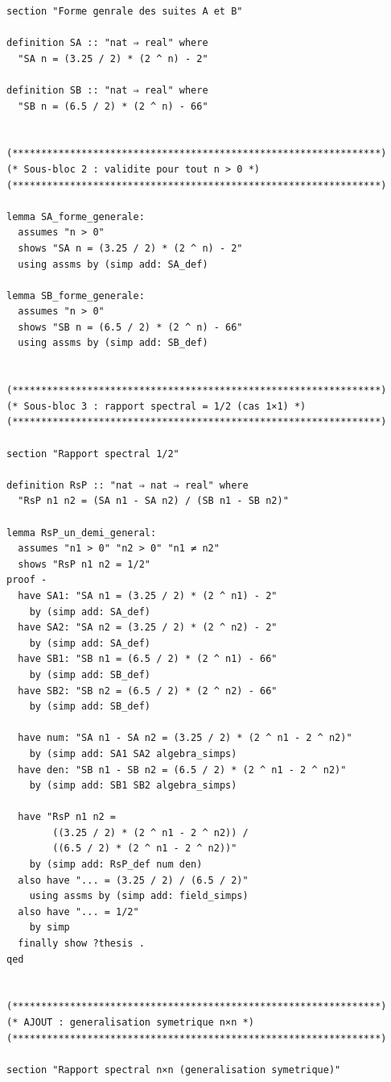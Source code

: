 \documentclass[a4paper,11pt]{article}
\begin{document}
\begin{holcode}[title={\textcolor{white}{Fichier : methode\_spectral.thy -- Partie 1/4}}]
\begin{lstlisting}
section "Forme genrale des suites A et B"

definition SA :: "nat ⇒ real" where
  "SA n = (3.25 / 2) * (2 ^ n) - 2"

definition SB :: "nat ⇒ real" where
  "SB n = (6.5 / 2) * (2 ^ n) - 66"


(****************************************************************)
(* Sous-bloc 2 : validite pour tout n > 0 *)
(****************************************************************)

lemma SA_forme_generale:
  assumes "n > 0"
  shows "SA n = (3.25 / 2) * (2 ^ n) - 2"
  using assms by (simp add: SA_def)

lemma SB_forme_generale:
  assumes "n > 0"
  shows "SB n = (6.5 / 2) * (2 ^ n) - 66"
  using assms by (simp add: SB_def)


(****************************************************************)
(* Sous-bloc 3 : rapport spectral = 1/2 (cas 1×1) *)
(****************************************************************)

section "Rapport spectral 1/2"

definition RsP :: "nat ⇒ nat ⇒ real" where
  "RsP n1 n2 = (SA n1 - SA n2) / (SB n1 - SB n2)"

lemma RsP_un_demi_general:
  assumes "n1 > 0" "n2 > 0" "n1 ≠ n2"
  shows "RsP n1 n2 = 1/2"
proof -
  have SA1: "SA n1 = (3.25 / 2) * (2 ^ n1) - 2"
    by (simp add: SA_def)
  have SA2: "SA n2 = (3.25 / 2) * (2 ^ n2) - 2"
    by (simp add: SA_def)
  have SB1: "SB n1 = (6.5 / 2) * (2 ^ n1) - 66"
    by (simp add: SB_def)
  have SB2: "SB n2 = (6.5 / 2) * (2 ^ n2) - 66"
    by (simp add: SB_def)

  have num: "SA n1 - SA n2 = (3.25 / 2) * (2 ^ n1 - 2 ^ n2)"
    by (simp add: SA1 SA2 algebra_simps)
  have den: "SB n1 - SB n2 = (6.5 / 2) * (2 ^ n1 - 2 ^ n2)"
    by (simp add: SB1 SB2 algebra_simps)

  have "RsP n1 n2 =
        ((3.25 / 2) * (2 ^ n1 - 2 ^ n2)) /
        ((6.5 / 2) * (2 ^ n1 - 2 ^ n2))"
    by (simp add: RsP_def num den)
  also have "... = (3.25 / 2) / (6.5 / 2)"
    using assms by (simp add: field_simps)
  also have "... = 1/2"
    by simp
  finally show ?thesis .
qed


(****************************************************************)
(* AJOUT : generalisation symetrique n×n *)
(****************************************************************)

section "Rapport spectral n×n (generalisation symetrique)"


\end{lstlisting}
\end{holcode}
\end{document}
